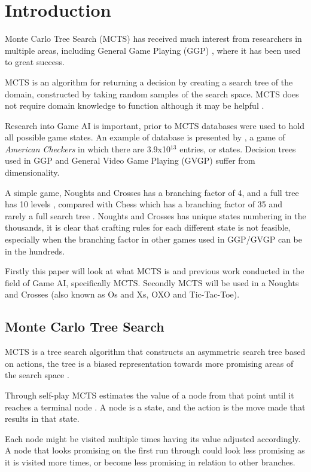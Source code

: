 \section{Introduction}
Monte Carlo Tree Search (MCTS) has received much interest from researchers in multiple areas, including General Game Playing (GGP) \cite{b1},  where it has been used to great success.

MCTS is an algorithm for returning a decision by creating a search tree of the domain, constructed by taking random samples of the search space. MCTS does not require domain knowledge to function although it may be helpful \cite{b2}.

Research into Game AI is important, prior to MCTS databases were used to hold all possible game states. An example of database is presented by \cite{b4}, a game of {\em American Checkers} in which there are 3.9x10$^{13}$ entries, or states. Decision trees used in GGP and General Video Game Playing (GVGP) suffer from dimensionality. 

A simple game, Noughts and Crosses has a branching factor of 4, and a full tree has 10 levels \cite{bartle}, compared with Chess which has a branching factor of 35 and rarely a full search tree \cite{bartle}. Noughts and Crosses has unique states numbering in the thousands, it is clear that crafting rules for each different state is not feasible, especially when the branching factor in other games used in GGP/GVGP can be in the hundreds. 

Firstly this paper will look at what MCTS is and previous work conducted in the field of Game AI, specifically MCTS. Secondly MCTS will be used in a Noughts and Crosses (also known as Os and Xs, OXO and Tic-Tac-Toe).

\subsection{Monte Carlo Tree Search}
MCTS is a tree search algorithm that constructs an asymmetric search tree based on actions, the tree is a biased representation towards more promising areas of the search space \cite{b5}.

Through self-play MCTS estimates the value of a node from that point until it reaches a terminal node \cite{b5}. A node is a state, and the action is the move made that results in that state.  

Each node might be visited multiple times having its value adjusted accordingly. A node that looks promising on the first run through could look less promising as it is visited more times, or become less promising in relation to other branches. 

